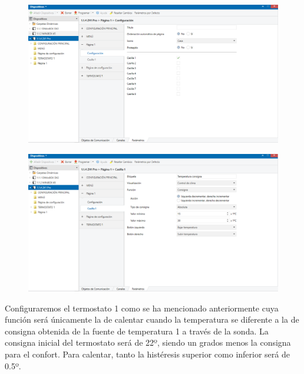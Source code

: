 \documentclass[10pt]{article}
\begin{document}
\begin{figure}[H]
	\begin{center}
	 		\includegraphics[width = 1.00\textwidth]{Imagenes/img26}
	\end{center} 
\end{figure}

\begin{figure}[H]
	\begin{center}
	 		\includegraphics[width = 1.00\textwidth]{Imagenes/img27}
	\end{center} 
\end{figure}

Configuraremos el termostato 1 como se ha mencionado anteriormente cuya función será únicamente la de calentar cuando la temperatura se diferente a la de consigna obtenida de la fuente de temperatura 1 a través de la sonda. La consigna inicial del termostato será de 22º, siendo un grados menos la consigna para el confort. Para calentar, tanto la histéresis superior como inferior será de 0.5º. \\
\end{document}
